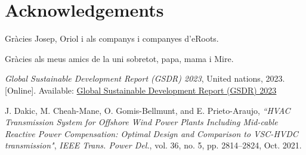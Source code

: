 \documentclass[a4paper,11pt, titlepage, twoside]{article}
\begin{document}
\section*{Acknowledgements}
 Gràcies Josep, Oriol i als companys i companyes d'eRoots.\par
 Gràcies als meus amics de la uni sobretot, papa, mama i Mire.

 
 
 \begin{thebibliography}{99}\label{biblio}
 

 \textit{Global Sustainable Development Report (GSDR) 2023}, United nations, 2023. [Online]. 
 Available: \href{https://sdgs.un.org/gsdr/gsdr2023}{Global Sustainable Development Report (GSDR) 2023}
 
{J. Dakic, M. Cheah-Mane, O. Gomis-Bellmunt, and E. Prieto-Araujo},
\textit{“HVAC Transmission System for Offshore Wind Power Plants Including
 Mid-cable Reactive Power Compensation: Optimal Design and Comparison to VSC-HVDC transmission"}, \textit{IEEE Trans. Power Del.}, vol. 36,
 no. 5, pp. 2814–2824, Oct. 2021.\\ 
 
 

 \end{thebibliography}
 
 
\end{document}
